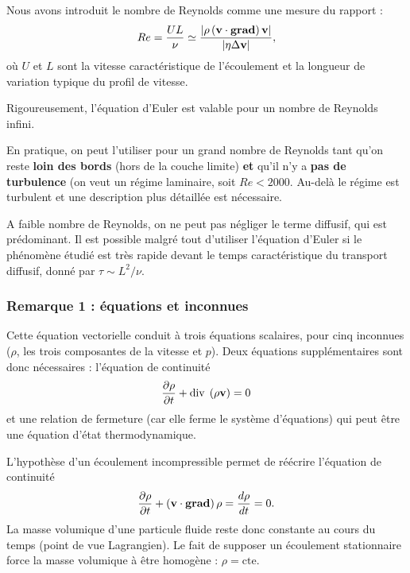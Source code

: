 \documentclass[11pt,a4paper]{report}
\begin{document}
Nous avons introduit le nombre de Reynolds comme une mesure du rapport :
\begin{equation}
	Re = \frac{U L}{\nu} \simeq \frac{|\rho \left(\bold{v}\cdot\textbf{grad} \right) \bold{v}|}{|\eta \Delta \bold{v}|},	
\end{equation}
où $U$ et $L$ sont la vitesse caractéristique de l'écoulement et la longueur de variation typique du profil de vitesse.

Rigoureusement, l'équation d'Euler est valable pour un nombre de Reynolds infini.

En pratique, on peut l'utiliser pour un grand nombre de Reynolds tant qu'on reste \textbf{loin des bords} (hors de la couche limite) \textbf{et} qu'il n'y a \textbf{pas de turbulence} (on veut un régime laminaire, soit $Re < 2000$. Au-delà le régime est turbulent et une description plus détaillée est nécessaire.

A faible nombre de Reynolds, on ne peut pas négliger le terme diffusif, qui est prédominant. Il est possible malgré tout d'utiliser l'équation d'Euler si le phénomène étudié est très rapide devant le temps caractéristique du transport diffusif, donné par $\tau \sim L^2/\nu$.  

\subsubsection{Remarque 1 : équations et inconnues}
Cette équation vectorielle conduit à trois équations scalaires, pour cinq inconnues ($\rho$, les trois composantes de la vitesse et $p$). 
Deux équations supplémentaires sont donc nécessaires : l'équation de continuité 
\begin{equation}
	\frac{\partial \rho}{\partial t} + \text{div}\;\left(\rho\bold{v}\right) = 0
\end{equation}
et une relation de fermeture (car elle ferme le système d'équations) qui peut être une équation d'état thermodynamique. 

L'hypothèse d'un écoulement incompressible permet de réécrire l'équation de continuité
\begin{equation}
	\frac{\partial \rho}{\partial t} + \left(\bold{v}\cdot\textbf{grad}\right)\rho = \frac{d\rho}{dt} = 0.
\end{equation} 
La masse volumique d'une particule fluide reste donc constante au cours du temps (point de vue Lagrangien). Le fait de supposer un écoulement stationnaire force la masse volumique à être homogène : $\rho = \text{cte}$.\\
\end{document}
